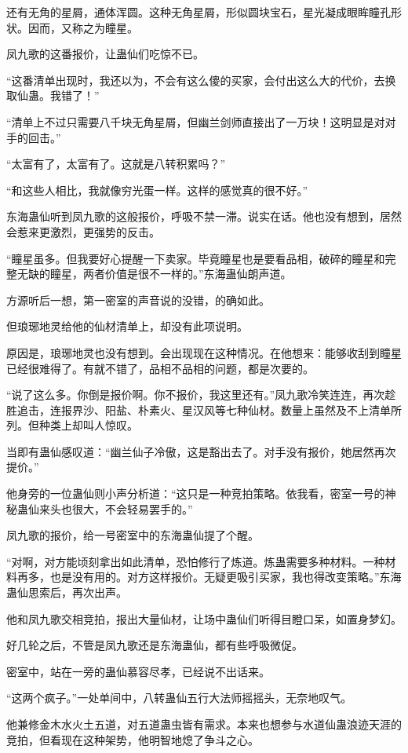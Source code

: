 \begin{this_body}
还有无角的星屑，通体浑圆。这种无角星屑，形似圆块宝石，星光凝成眼眸瞳孔形状。因而，又称之为瞳星。

凤九歌的这番报价，让蛊仙们吃惊不已。

“这番清单出现时，我还以为，不会有这么傻的买家，会付出这么大的代价，去换取仙蛊。我错了！”

“清单上不过只需要八千块无角星屑，但幽兰剑师直接出了一万块！这明显是对对手的回击。”

“太富有了，太富有了。这就是八转积累吗？”

“和这些人相比，我就像穷光蛋一样。这样的感觉真的很不好。”

东海蛊仙听到凤九歌的这般报价，呼吸不禁一滞。说实在话。他也没有想到，居然会惹来更激烈，更强势的反击。

“瞳星虽多。但我要好心提醒一下卖家。毕竟瞳星也是要看品相，破碎的瞳星和完整无缺的瞳星，两者价值是很不一样的。”东海蛊仙朗声道。

方源听后一想，第一密室的声音说的没错，的确如此。

但琅琊地灵给他的仙材清单上，却没有此项说明。

原因是，琅琊地灵也没有想到。会出现现在这种情况。在他想来：能够收刮到瞳星已经很难得了。有就不错了，品相不品相的问题，都是次要的。

“说了这么多。你倒是报价啊。你不报价，我这里还有。”凤九歌冷笑连连，再次趁胜追击，连报界沙、阳盐、朴素火、星汉风等七种仙材。数量上虽然及不上清单所列。但种类上却叫人惊叹。

当即有蛊仙感叹道：“幽兰仙子冷傲，这是豁出去了。对手没有报价，她居然再次提价。”

他身旁的一位蛊仙则小声分析道：“这只是一种竞拍策略。依我看，密室一号的神秘蛊仙来头也很大，不会轻易罢手的。”

凤九歌的报价，给一号密室中的东海蛊仙提了个醒。

“对啊，对方能顷刻拿出如此清单，恐怕修行了炼道。炼蛊需要多种材料。一种材料再多，也是没有用的。对方这样报价。无疑更吸引买家，我也得改变策略。”东海蛊仙思索后，再次出声。

他和凤九歌交相竞拍，报出大量仙材，让场中蛊仙们听得目瞪口呆，如置身梦幻。

好几轮之后，不管是凤九歌还是东海蛊仙，都有些呼吸微促。

密室中，站在一旁的蛊仙慕容尽孝，已经说不出话来。

“这两个疯子。”一处单间中，八转蛊仙五行大法师摇摇头，无奈地叹气。

他兼修金木水火土五道，对五道蛊虫皆有需求。本来也想参与水道仙蛊浪迹天涯的竞拍，但看现在这种架势，他明智地熄了争斗之心。


\end{this_body}
